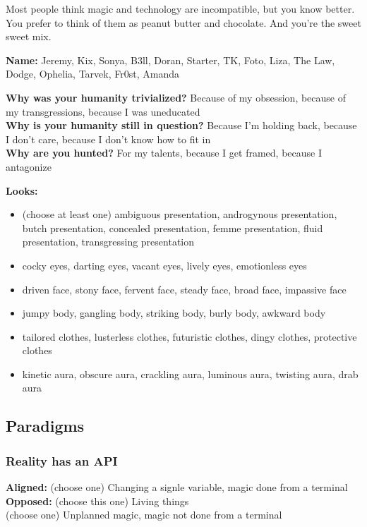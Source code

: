\documentclass[10pt,twoside,openright]{memoir}
\begin{document}
Most people think magic and technology are incompatible, but you know
better. You prefer to think of them as peanut butter and chocolate. And
you're the sweet sweet mix.

\textbf{Name:} Jeremy, Kix, Sonya, B3ll, Doran, Starter, TK, Foto, Liza,
The Law, Dodge, Ophelia, Tarvek, Fr0st, Amanda

\textbf{Why was your humanity trivialized?} Because of my obsession,
because of my transgressions, because I was uneducated\\
\textbf{Why is your humanity still in question?} Because I'm holding
back, because I don't care, because I don't know how to fit in\\
\textbf{Why are you hunted?} For my talents, because I get framed,
because I antagonize

\textbf{Looks:}

\begin{itemize}
\tightlist
\item
  (choose at least one) ambiguous presentation, androgynous
  presentation, butch presentation, concealed presentation, femme
  presentation, fluid presentation, transgressing presentation
\item
  cocky eyes, darting eyes, vacant eyes, lively eyes, emotionless eyes
\item
  driven face, stony face, fervent face, steady face, broad face,
  impassive face
\item
  jumpy body, gangling body, striking body, burly body, awkward body
\item
  tailored clothes, lusterless clothes, futuristic clothes, dingy
  clothes, protective clothes
\item
  kinetic aura, obscure aura, crackling aura, luminous aura, twisting
  aura, drab aura
\end{itemize}

\hypertarget{paradigms-6}{%
\subsection{Paradigms}\label{paradigms-6}}

\hypertarget{reality-has-an-api}{%
\subsubsection{Reality has an API}\label{reality-has-an-api}}

\textbf{Aligned:} (choose one) Changing a signle variable, magic done
from a terminal\\
\textbf{Opposed:} (choose this one) Living things\\
(choose one) Unplanned magic, magic not done from a terminal
\end{document}
